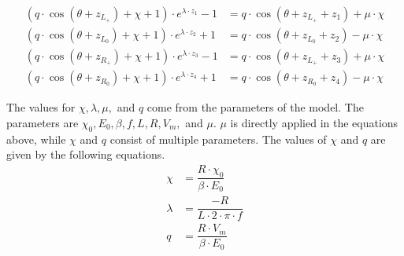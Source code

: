 \begin{subequations}
	\begin{align}
		(q \cdot \cos(\theta + z_{L_+}) + \chi + 1) \cdot e^{\lambda \cdot z_1} - 1
		 & = q \cdot  \cos(\theta + z_{L_+} + z_1) + \mu \cdot \chi \\
		(q \cdot \cos(\theta + z_{L_0}) + \chi + 1) \cdot e^{\lambda \cdot z_2} + 1
		 & = q \cdot  \cos(\theta + z_{L_0} + z_2) - \mu \cdot \chi \\
		(q \cdot \cos(\theta + z_{R_+}) + \chi + 1) \cdot e^{\lambda \cdot z_3} - 1
		 & = q \cdot  \cos(\theta + z_{L_+} + z_3) + \mu \cdot \chi \\
		(q \cdot \cos(\theta + z_{R_0}) + \chi + 1) \cdot e^{\lambda \cdot z_4} + 1
		 & = q \cdot  \cos(\theta + z_{R_0} + z_4) - \mu \cdot \chi
	\end{align}
\end{subequations}


The values for $\chi, \lambda, \mu,$ and $q$ come from the parameters of the model.
The parameters are $\chi_0, E_0, \beta, f, L, R, V_m,$ and $\mu$.
$\mu$ is directly applied in the equations above, while $\chi$ and $q$ consist of multiple parameters.
The values of $\chi$ and $q$ are given by the following equations.
\begin{align}
	\chi    & = \dfrac{R \cdot \chi_0}{\beta \cdot E_0} \\
	\lambda & = \dfrac{-R}{L \cdot 2 \cdot \pi \cdot f} \\
	q       & = \dfrac{R \cdot V_m}{\beta \cdot E_0}
\end{align}
